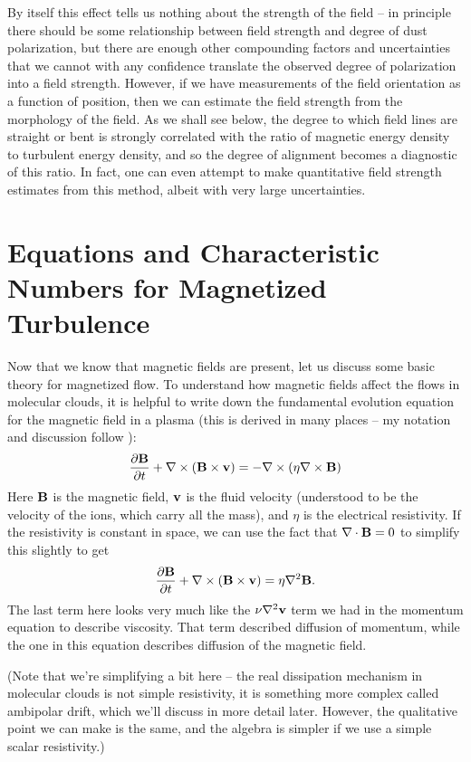 By itself this effect tells us nothing about the strength of the field -- in principle there should be some relationship between field strength and degree of dust polarization, but there are enough other compounding factors and uncertainties that we cannot with any confidence translate the observed degree of polarization into a field strength. However, if we have measurements of the field orientation as a function of position, then we can estimate the field strength from the morphology of the field. As we shall see below, the degree to which field lines are straight or bent is strongly correlated with the ratio of magnetic energy density to turbulent energy density, and so the degree of alignment becomes a diagnostic of this ratio. In fact, one can even attempt to make quantitative field strength estimates from this method, albeit with very large uncertainties.


\section{Equations and Characteristic Numbers for Magnetized Turbulence}

Now that we know that magnetic fields are present, let us discuss some basic theory for magnetized flow. To understand how magnetic fields affect the flows in molecular clouds, it is helpful to write down the fundamental evolution equation for the magnetic field in a plasma (this is derived in many places -- my notation and discussion follow \citealt{shu92a}):
\begin{equation}
\frac{\partial \mathbf{B}}{\partial t} + \nabla \times (\mathbf{B} \times \mathbf{v}) = -\nabla \times (\eta \nabla \times \mathbf{B})
\end{equation}
Here $\mathbf{B}$ is the magnetic field, $\mathbf{v}$ is the fluid velocity (understood to be the velocity of the ions, which carry all the mass), and $\eta$ is the electrical resistivity. If the resistivity is constant in space, we can use the fact that $\nabla \cdot \mathbf{B}=0$ to simplify this slightly to get
\begin{equation}
\frac{\partial \mathbf{B}}{\partial t} + \nabla \times (\mathbf{B} \times \mathbf{v}) = \eta \nabla^2 \mathbf{B}.
\end{equation}
The last term here looks very much like the $\nu\nabla^2 \mathbf{v}$ term we had in the momentum equation to describe viscosity. That term described diffusion of momentum, while the one in this equation describes diffusion of the magnetic field.

(Note that we're simplifying a bit here -- the real dissipation mechanism in molecular clouds is not simple resistivity, it is something more complex called ambipolar drift, which we'll discuss in more detail later. However, the qualitative point we can make is the same, and the algebra is simpler if we use a simple scalar resistivity.)

